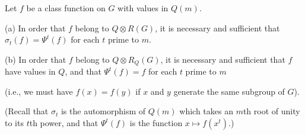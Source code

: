 Let $f$ be a class function on $G$ with values in $Q(m)$.

(a) In order that $f$ belong to $Q \otimes R(G)$, it is necessary and sufficient that $\sigma_t(f) = \Psi^t(f)$ for each $t$ prime to $m$.

(b) In order that $f$ belong to $Q \otimes R_Q(G)$, it is necessary and sufficient that $f$ have values in $Q$, and that $\Psi^t(f) = f$ for each $t$ prime to $m$

(i.e., we must have $f(x) = f(y)$ if $x$ and $y$ generate the same subgroup of $G$).

(Recall that $\sigma_t$ is the automorphism of $Q(m)$ which takes an $m$th root of unity to its $t$th power, and that $\Psi^t(f)$ is the function $x \mapsto f(x^t)$.)
